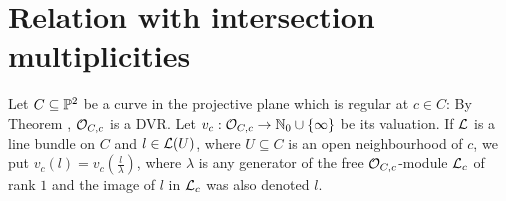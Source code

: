 \documentclass[a4paper,parskip=half,numbers=enddot, DIV=12, headheight=30pt]{scrreprt}
\begin{document}



\section{Relation with intersection multiplicities}Let $C\subseteq \mathbb{P}^2$ be a curve in the projective plane which is regular at $c\in C$:
By Theorem , $\mathcal{O}_{C,c}$ is a DVR. Let $v_c : \mathcal{O}_{C,c} \rightarrow\mathbb{N}_0\cup\{\infty\}$ be its valuation.
If $\mathcal{L}$ is a line bundle on $C$ and $l\in \mathcal{L}(U)$, where
$U\subseteq C$ is an open neighbourhood of $c$, we put $v_c(l) = v_c\left(\frac l\lambda\right)$, where $\lambda$
is any generator of the free $\mathcal{O}_{C,c}$-module $\mathcal{L}_c$ of rank $1$ and the image of $l$ in $\mathcal{L}_c$ was also denoted $l$.
\end{document}
